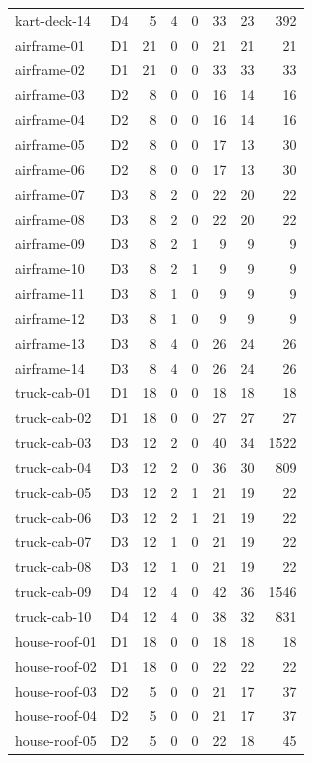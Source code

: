 \begin{longtable}{llrrrrrr}
kart-deck-14 & D4 & 5 & 4 & 0 & 33 & 23 & 392\\
airframe-01 & D1 & 21 & 0 & 0 & 21 & 21 & 21\\
airframe-02 & D1 & 21 & 0 & 0 & 33 & 33 & 33\\
airframe-03 & D2 & 8 & 0 & 0 & 16 & 14 & 16\\
airframe-04 & D2 & 8 & 0 & 0 & 16 & 14 & 16\\
airframe-05 & D2 & 8 & 0 & 0 & 17 & 13 & 30\\
airframe-06 & D2 & 8 & 0 & 0 & 17 & 13 & 30\\
airframe-07 & D3 & 8 & 2 & 0 & 22 & 20 & 22\\
airframe-08 & D3 & 8 & 2 & 0 & 22 & 20 & 22\\
airframe-09 & D3 & 8 & 2 & 1 & 9 & 9 & 9\\
airframe-10 & D3 & 8 & 2 & 1 & 9 & 9 & 9\\
airframe-11 & D3 & 8 & 1 & 0 & 9 & 9 & 9\\
airframe-12 & D3 & 8 & 1 & 0 & 9 & 9 & 9\\
airframe-13 & D3 & 8 & 4 & 0 & 26 & 24 & 26\\
airframe-14 & D3 & 8 & 4 & 0 & 26 & 24 & 26\\
truck-cab-01 & D1 & 18 & 0 & 0 & 18 & 18 & 18\\
truck-cab-02 & D1 & 18 & 0 & 0 & 27 & 27 & 27\\
truck-cab-03 & D3 & 12 & 2 & 0 & 40 & 34 & 1522\\
truck-cab-04 & D3 & 12 & 2 & 0 & 36 & 30 & 809\\
truck-cab-05 & D3 & 12 & 2 & 1 & 21 & 19 & 22\\
truck-cab-06 & D3 & 12 & 2 & 1 & 21 & 19 & 22\\
truck-cab-07 & D3 & 12 & 1 & 0 & 21 & 19 & 22\\
truck-cab-08 & D3 & 12 & 1 & 0 & 21 & 19 & 22\\
truck-cab-09 & D4 & 12 & 4 & 0 & 42 & 36 & 1546\\
truck-cab-10 & D4 & 12 & 4 & 0 & 38 & 32 & 831\\
house-roof-01 & D1 & 18 & 0 & 0 & 18 & 18 & 18\\
house-roof-02 & D1 & 18 & 0 & 0 & 22 & 22 & 22\\
house-roof-03 & D2 & 5 & 0 & 0 & 21 & 17 & 37\\
house-roof-04 & D2 & 5 & 0 & 0 & 21 & 17 & 37\\
house-roof-05 & D2 & 5 & 0 & 0 & 22 & 18 & 45\\

\end{longtable}
